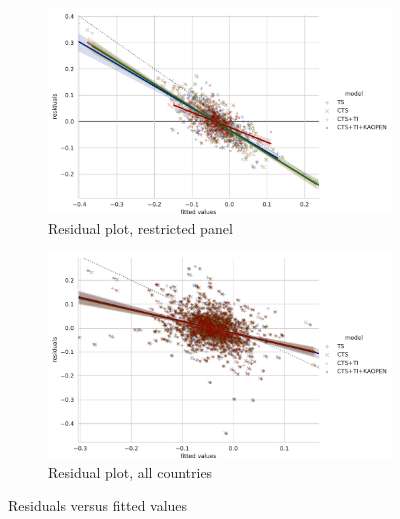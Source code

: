 \documentclass[12pt,a4paper]{article}
\begin{document}
\begin{figure}[htbp]
\centering
\begin{subfigure}{0.90\textwidth}
\includegraphics[width=\textwidth]{./plots/dis/diffGMM_residual_plot_subset.pdf}
\caption{Residual plot, restricted panel}
\end{subfigure}
\begin{subfigure}{0.90\textwidth}
\includegraphics[width=\textwidth]{./plots/dis/diffGMM_residual_plot_all.pdf}
\caption{Residual plot, all countries}
\end{subfigure}
\caption[]{Residuals versus fitted values}
\end{figure}



\restoregeometry{}
\end{document}
